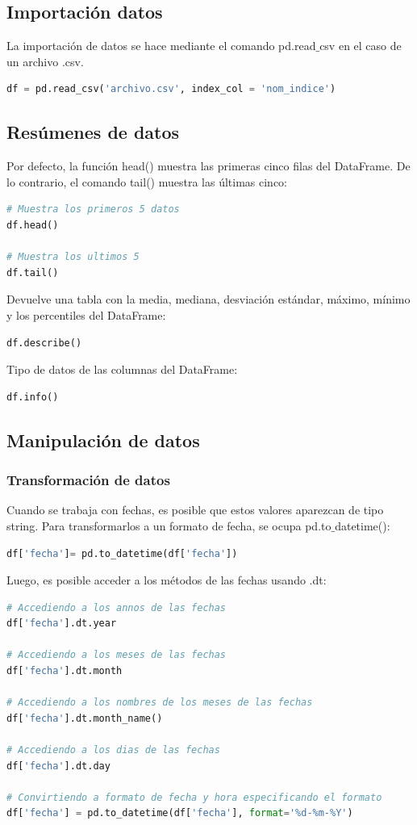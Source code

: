 \documentclass[a4paper, 12pt]{book}
\begin{document}
\subsection{Importación datos}
La importación de datos se hace mediante el comando pd.read$\_$csv en el caso de un archivo .csv.
\begin{lstlisting}[language=Python]
df = pd.read_csv('archivo.csv', index_col = 'nom_indice')
\end{lstlisting}

\subsection{Resúmenes de datos}
Por defecto, la función head() muestra las primeras cinco filas del DataFrame. De lo contrario, el comando tail() muestra las últimas cinco:
\begin{lstlisting}[language=Python]
# Muestra los primeros 5 datos
df.head()
	
# Muestra los ultimos 5
df.tail()
\end{lstlisting}

Devuelve una tabla con la media, mediana, desviación estándar, máximo, mínimo y los percentiles del DataFrame:
\begin{lstlisting}[language=Python]
df.describe()
\end{lstlisting}

Tipo de datos de las columnas del DataFrame:
\begin{lstlisting}[language=Python]
df.info()
\end{lstlisting}


\subsection{Manipulación de datos}

\subsubsection{Transformación de datos}
Cuando se trabaja con fechas, es posible que estos valores aparezcan de tipo string. Para transformarlos a un formato de fecha, se ocupa pd.to$\_$datetime():
\begin{lstlisting}[language=Python]
df['fecha']= pd.to_datetime(df['fecha'])
\end{lstlisting}
Luego, es posible acceder a los métodos de las fechas usando .dt:
\begin{lstlisting}[language=Python]
# Accediendo a los annos de las fechas
df['fecha'].dt.year

# Accediendo a los meses de las fechas
df['fecha'].dt.month

# Accediendo a los nombres de los meses de las fechas
df['fecha'].dt.month_name()

# Accediendo a los dias de las fechas
df['fecha'].dt.day

# Convirtiendo a formato de fecha y hora especificando el formato
df['fecha'] = pd.to_datetime(df['fecha'], format='%d-%m-%Y')
\end{lstlisting}
\end{document}
